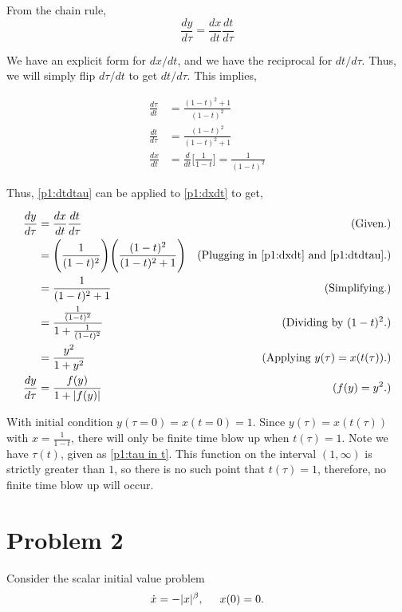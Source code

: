 \begin{solution}
    From the chain rule,
    \[\frac{dy}{d\tau} = \frac{dx}{dt}\frac{dt}{d\tau}\]

    We have an explicit form for $dx/dt$, and we have the reciprocal for $dt/d\tau$. Thus, we will simply flip $d\tau/dt$ to get $dt/d\tau$. This implies,

    \alignbreak
    \begin{align}
        \frac{d\tau}{dt} &= \frac{(1 - t)^2 + 1}{(1 - t)^2} \nonumber\\
        \frac{dt}{d\tau} &= \frac{(1 - t)^2}{(1 - t)^2 + 1} \label{p1:dtdtau}\\  
        \frac{dx}{dt} &= \frac{d}{dt}\Bigg[ \frac{1}{1 - t}\Bigg] = \frac{1}{(1 - t)^2} \label{p1:dxdt}
    \end{align}
    \alignbreak

    Thus, \ref{p1:dtdtau} can be applied to \ref{p1:dxdt} to get, 

    \alignbreak
    \begin{align}
        \frac{dy}{d\tau} &= \frac{dx}{dt}\frac{dt}{d\tau} &\text{(Given.)}\nonumber\\
        &= \Bigg(\frac{1}{(1 - t)^2}\Bigg)\Bigg( \frac{(1 - t)^2}{(1 - t)^2 + 1}\Bigg) &\text{(Plugging in \ref{p1:dxdt} and \ref{p1:dtdtau}.)}\nonumber\\
        &= \frac{1}{(1 - t)^2 + 1} &\text{(Simplifying.)}\nonumber\\
        &= \frac{\frac{1}{(1 - t)^2}}{1 + \frac{1}{(1 - t)^2}} &\text{(Dividing by $(1 - t)^2$.)}\nonumber\\
        &= \frac{y^2}{1 + y^2} &\text{(Applying $y(\tau) = x(t(\tau))$.)}\nonumber\\
        \frac{dy}{d\tau} &= \frac{f(y)}{1 + |f(y)|} &\text{($f(y) = y^2$.)}\nonumber
    \end{align}
    \alignbreak

    With initial condition $y(\tau = 0) = x(t = 0) = 1$. Since $y(\tau) = x(t(\tau))$ with $x = \frac{1}{1 - t}$, there will only be finite time blow up when $t(\tau) = 1$. Note we have $\tau(t)$, given as \ref{p1:tau in t}. This function on the interval $(1, \infty)$ is strictly greater than $1$, so there is no such point that $t(\tau) = 1$, therefore, no finite time blow up will occur. 
\end{solution}%

\newpage

\section{Problem 2}
Consider the scalar initial value problem
\begin{align}
    \dot{x} = -|x|^\beta, \hspace{5mm} x(0) = 0. \label{p2:ODE}
\end{align}

